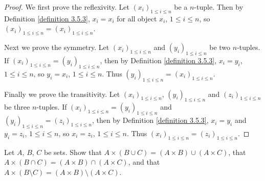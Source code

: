 \begin{proof}
We first prove the reflexivity.
Let \((x_i)_{1 \leq i \leq n}\) be a \(n\)-tuple.
Then by Definition \ref{definition 3.5.3}, \(x_i = x_i\) for all object \(x_i\), \(1 \leq i \leq n\), so \((x_i)_{1 \leq i \leq n} = (x_i)_{1 \leq i \leq n}\).

Next we prove the symmetry.
Let \((x_i)_{1 \leq i \leq n}\) and \((y_i)_{1 \leq i \leq n}\) be two \(n\)-tuples.
If \((x_i)_{1 \leq i \leq n} = (y_i)_{1 \leq i \leq n}\), then by Definition \ref{definition 3.5.3}, \(x_i = y_i\), \(1 \leq i \leq n\), so \(y_i = x_i\), \(1 \leq i \leq n\).
Thus \((y_i)_{1 \leq i \leq n} = (x_i)_{1 \leq i \leq n}\).

Finally we prove the transitivity.
Let \((x_i)_{1 \leq i \leq n}\), \((y_i)_{1 \leq i \leq n}\) and \((z_i)_{1 \leq i \leq n}\) be three \(n\)-tuples.
If \((x_i)_{1 \leq i \leq n} = (y_i)_{1 \leq i \leq n}\) and \((y_i)_{1 \leq i \leq n} = (z_i)_{1 \leq i \leq n}\), then by Definition \ref{definition 3.5.3}, \(x_i = y_i\) and \(y_i = z_i\), \(1 \leq i \leq n\), so \(x_i = z_i\), \(1 \leq i \leq n\).
Thus \((x_i)_{1 \leq i \leq n} = (z_i)_{1 \leq i \leq n}\).
\end{proof}

\begin{exercise}\label{exercise 3.5.4}
Let \(A\), \(B\), \(C\) be sets.
Show that \(A \times (B \cup C) = (A \times B) \cup (A \times C)\), that \(A \times (B \cap C) = (A \times B) \cap (A \times C)\), and that \(A \times (B \setminus C) = (A \times B) \setminus (A \times C)\).
\end{exercise}


